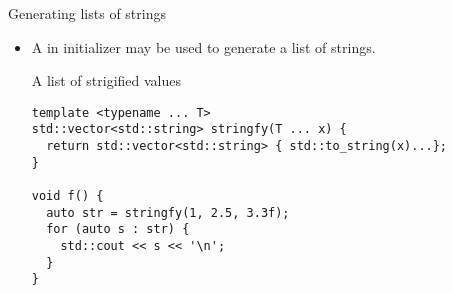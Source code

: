 \begin{frame}[t,fragile]{Generating lists of strings}
\begin{itemize}
  \item A  in initializer may be used to generate a 
        list of strings.
\begin{block}{A list of strigified values}
\begin{lstlisting}
template <typename ... T>
std::vector<std::string> stringfy(T ... x) {
  return std::vector<std::string> { std::to_string(x)...};
}

void f() {
  auto str = stringfy(1, 2.5, 3.3f);
  for (auto s : str) {
    std::cout << s << '\n';
  }
}
\end{lstlisting}
\end{block}

\end{itemize}
\end{frame}
